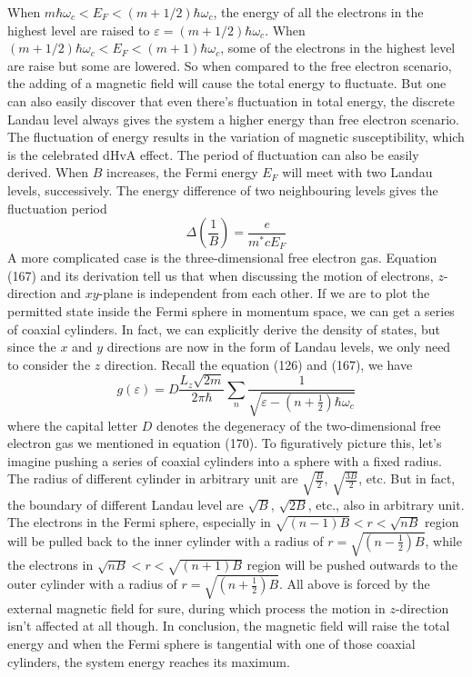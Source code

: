 \documentclass{article}
\begin{document}
When $m\hbar\omega_c<E_F<(m+1/2)\hbar\omega_c$, the energy of all the electrons in the highest level are raised to $\varepsilon=(m+1/2)\hbar\omega_c$. When $(m+1/2)\hbar\omega_c<E_F<(m+1)\hbar\omega_c$, some of the electrons in the highest level are raise but some are lowered. So when compared to the free electron scenario, the adding of a magnetic field will cause the total energy to fluctuate. But one can also easily discover that even there's fluctuation in total energy, the discrete Landau level always gives the system a higher energy than free electron scenario. The fluctuation of energy results in the variation of magnetic susceptibility, which is the celebrated dHvA effect. The period of fluctuation can also be easily derived. When $B$ increases, the Fermi energy $E_F$ will meet with two Landau levels, successively. The energy difference of two neighbouring levels gives the fluctuation period\begin{equation}
    \Delta(\frac{1}{B})=\frac{e}{m^*cE_F}
\end{equation}A more complicated case is the three-dimensional free electron gas. Equation (167) and its derivation tell us that when discussing the motion of electrons, $z$-direction and $xy$-plane is independent from each other. If we are to plot the permitted state inside the Fermi sphere in momentum space, we can get a series of coaxial cylinders. In fact, we can explicitly derive the density of states, but since the $x$ and $y$ directions are now in the form of Landau levels, we only need to consider the $z$ direction. Recall the equation (126) and (167), we have\begin{equation}
    g(\varepsilon)=D\frac{L_z\sqrt{2m}}{2\pi\hbar}\sum_n\frac{1}{\sqrt{\varepsilon-(n+\frac12)\hbar\omega_c}}
\end{equation}where the capital letter $D$ denotes the degeneracy of the two-dimensional free electron gas we mentioned in equation (170). To figuratively picture this, let's imagine pushing a series of coaxial cylinders into a sphere with a fixed radius. The radius of different cylinder in arbitrary unit are $\sqrt{\frac{B}2}$, $\sqrt{\frac{3B}2}$, etc. But in fact, the boundary of different Landau level are $\sqrt{B}$, $\sqrt{2B}$, etc., also in arbitrary unit. The electrons in the Fermi sphere, especially in $\sqrt{(n-1)B}<r<\sqrt{nB}$ region will be pulled back to the inner cylinder with a radius of $r=\sqrt{(n-\frac12)B}$, while the electrons in $\sqrt{nB}<r<\sqrt{(n+1)B}$ region will be pushed outwards to the outer cylinder with a radius of $r=\sqrt{(n+\frac12)B}$. All above is forced by the external magnetic field for sure, during which process the motion in $z$-direction isn't affected at all though. In conclusion, the magnetic field will raise the total energy and when the Fermi sphere is tangential with one of those coaxial cylinders, the system energy reaches its maximum.\\
\end{document}
